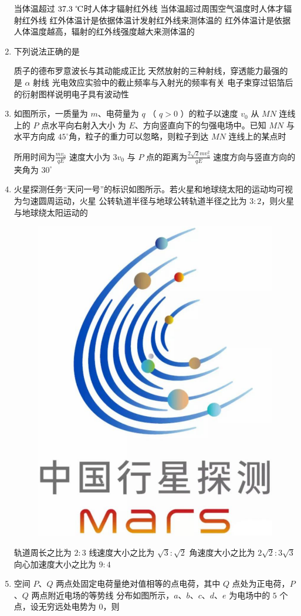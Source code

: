 \begin{enumerate}
\fourchoices
{当体温超过 $ 37.3 \ \celsius $时人体才辐射红外线}
{当体温超过周围空气温度时人体才辐射红外线}
{红外体温计是依据体温计发射红外线来测体温的}
{红外体温计是依据人体温度越高，辐射的红外线强度越大来测体温的}



\item
下列说法正确的是  


\fourchoices
{质子的德布罗意波长与其动能成正比}
{天然放射的三种射线，穿透能力最强的是 $ \alpha $ 射线}
{光电效应实验中的截止频率与入射光的频率有关}
{电子束穿过铝箔后的衍射图样说明电子具有波动性}


\item
如图所示，一质量为 $ m $、电荷量为 $ q $ （ $ q>0 $ ）的粒子以速度 $ v_{0} $ 从 $ MN $ 连线上的 $ P $ 点水平向右射入大小
为 $ E $、方向竖直向下的匀强电场中。已知 $ MN $ 与水平方向成 $ 45 ^{ \circ } $角，粒子的重力可以忽略，则粒子到达 $ MN $
连线上的某点时  
\begin{figure}[h!]
\centering

\end{figure}


\fourchoices
{所用时间为$\frac{m v_{0}}{q E}$}
{速度大小为 $ 3 v_{0} $}
{与 $ P $ 点的距离为$\frac{2 \sqrt{2} m v_{0}^{2}}{q E}$}
{速度方向与竖直方向的夹角为 $ 30 ^{ \circ } $}


\item
火星探测任务“天问一号”的标识如图所示。若火星和地球绕太阳的运动均可视为匀速圆周运动，火星
公转轨道半径与地球公转轨道半径之比为 $ 3:2 $，则火星与地球绕太阳运动的  
\begin{figure}[h!]
\centering
\includegraphics[width=0.17\linewidth]{picture/screenshot045}
\end{figure}


\fourchoices
{轨道周长之比为 $ 2:3 $}
{线速度大小之比为 $ \sqrt{3} : \sqrt{2} $}
{角速度大小之比为 $2 \sqrt{2}: 3 \sqrt{3}$}
{向心加速度大小之比为 $ 9:4 $}




\item
空间 $ P $、$ Q $ 两点处固定电荷量绝对值相等的点电荷，其中 $ Q $ 点处为正电荷，$ P $、$ Q $ 两点附近电场的等势线
分布如图所示，$ a $、$ b $、$ c $、$ d $、$ e $ 为电场中的 $ 5 $ 个点，设无穷远处电势为 $ 0 $，则  
\begin{figure}[h!]
\centering

\end{figure}




\end{enumerate}
